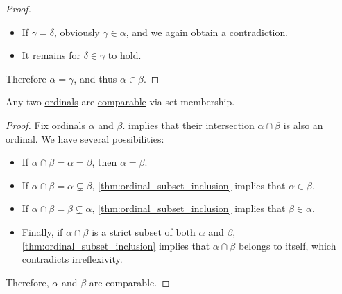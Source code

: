 \begin{proof}
\begin{itemize}
    \item If \( \gamma = \delta \), obviously \( \gamma \in \alpha \), and we again obtain a contradiction.

    \item It remains for \( \delta \in \gamma \) to hold.
  \end{itemize}

  Therefore \( \alpha = \gamma \), and thus \( \alpha \in \beta \).
\end{proof}

\begin{proposition}\label{thm:ordinal_trichotomy}
  Any two \hyperref[def:ordinal]{ordinals} are \hyperref[def:partially_ordered_set/comparable]{comparable} via set membership.
\end{proposition}
\begin{proof}
  Fix ordinals \( \alpha \) and \( \beta \).  implies that their intersection \( \alpha \cap \beta \) is also an ordinal. We have several possibilities:
  \begin{itemize}
    \item If \( \alpha \cap \beta = \alpha = \beta \), then \( \alpha = \beta \).
    \item If \( \alpha \cap \beta = \alpha \subsetneq \beta \), \cref{thm:ordinal_subset_inclusion} implies that \( \alpha \in \beta \).
    \item If \( \alpha \cap \beta = \beta \subsetneq \alpha \), \cref{thm:ordinal_subset_inclusion} implies that \( \beta \in \alpha \).
    \item Finally, if \( \alpha \cap \beta \) is a strict subset of both \( \alpha \) and \( \beta \), \cref{thm:ordinal_subset_inclusion} implies that \( \alpha \cap \beta \) belongs to itself, which contradicts irreflexivity.
  \end{itemize}

  Therefore, \( \alpha \) and \( \beta \) are comparable.
\end{proof}

